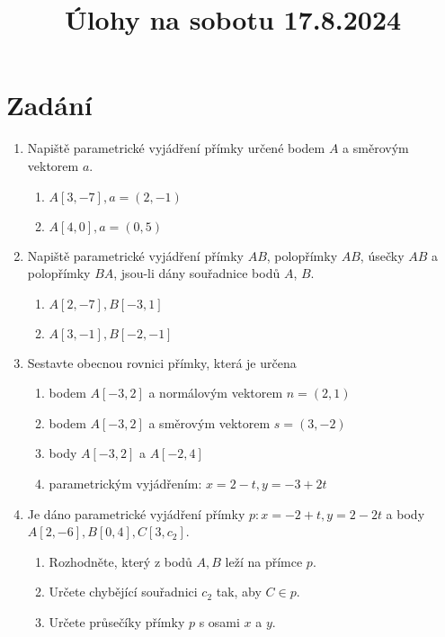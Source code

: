 \documentclass[]{article}
\title{
	{\textbf{Úlohy na sobotu 17.8.2024}}
}
\date{}
\begin{document}
	
	\maketitle
	
	\section{Zadání}
	
	\begin{enumerate}
		\item Napiště parametrické vyjádření přímky určené bodem $A$ a směrovým vektorem $a$.
		\begin{enumerate}
			\item $A[3, -7], a = (2, -1)$
			\item $A[4,0], a = (0,5)$
		\end{enumerate}
		\item Napiště parametrické vyjádření přímky $AB$, polopřímky $AB$, úsečky $AB$ a polopřímky $BA$, jsou-li dány souřadnice bodů $A$, $B$.
		\begin{enumerate}
			\item $A[2, -7], B[-3, 1]$
			\item $A[3, -1], B[-2, -1]$
		\end{enumerate} 
		\item Sestavte obecnou rovnici přímky, která je určena
		\begin{enumerate}
			\item bodem $A[-3, 2]$ a normálovým vektorem $n=(2,1)$
			\item bodem $A[-3, 2]$ a směrovým vektorem $s=(3,-2)$
			\item body $A[-3, 2]$ a $A[-2, 4]$
			\item parametrickým vyjádřením: $x = 2 - t, y = -3 + 2t$
		\end{enumerate}
		
		\item Je dáno parametrické vyjádření přímky $p: x = -2 + t, y = 2 - 2t$ a body $A[2, -6], B[0,4], C[3, c_2]$.
		\begin{enumerate}
			\item Rozhodněte, který z bodů $A, B$ leží na přímce $p$.
			\item Určete chybějící souřadnici $c_2$ tak, aby $C \in p$.
			\item Určete průsečíky přímky $p$ s osami $x$ a $y$.
		\end{enumerate}
	\end{enumerate}
	
\end{document}
